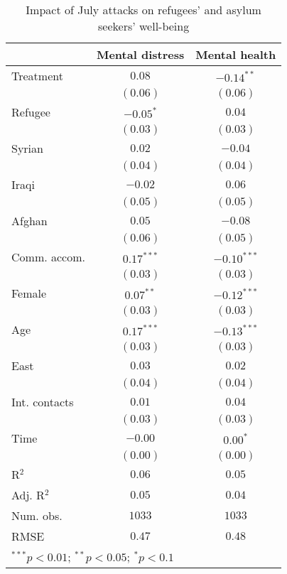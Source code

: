 
\begin{table}
\caption{Impact of July attacks on refugees' and asylum seekers' well-being}
\begin{center}
\begin{tabular}{l c c}
\toprule
 & Mental distress & Mental health \\
\midrule
Treatment     & $0.08$       & $-0.14^{**}$  \\
              & $(0.06)$     & $(0.06)$      \\
Refugee       & $-0.05^{*}$  & $0.04$        \\
              & $(0.03)$     & $(0.03)$      \\
Syrian        & $0.02$       & $-0.04$       \\
              & $(0.04)$     & $(0.04)$      \\
Iraqi         & $-0.02$      & $0.06$        \\
              & $(0.05)$     & $(0.05)$      \\
Afghan        & $0.05$       & $-0.08$       \\
              & $(0.06)$     & $(0.05)$      \\
Comm. accom.  & $0.17^{***}$ & $-0.10^{***}$ \\
              & $(0.03)$     & $(0.03)$      \\
Female        & $0.07^{**}$  & $-0.12^{***}$ \\
              & $(0.03)$     & $(0.03)$      \\
Age           & $0.17^{***}$ & $-0.13^{***}$ \\
              & $(0.03)$     & $(0.03)$      \\
East          & $0.03$       & $0.02$        \\
              & $(0.04)$     & $(0.04)$      \\
Int. contacts & $0.01$       & $0.04$        \\
              & $(0.03)$     & $(0.03)$      \\
Time          & $-0.00$      & $0.00^{*}$    \\
              & $(0.00)$     & $(0.00)$      \\
\midrule
R$^2$         & $0.06$       & $0.05$        \\
Adj. R$^2$    & $0.05$       & $0.04$        \\
Num. obs.     & $1033$       & $1033$        \\
RMSE          & $0.47$       & $0.48$        \\
\bottomrule
\multicolumn{3}{l}{\scriptsize{$^{***}p<0.01$; $^{**}p<0.05$; $^{*}p<0.1$}}
\end{tabular}
\label{tab_mhealth}
\end{center}
\end{table}
